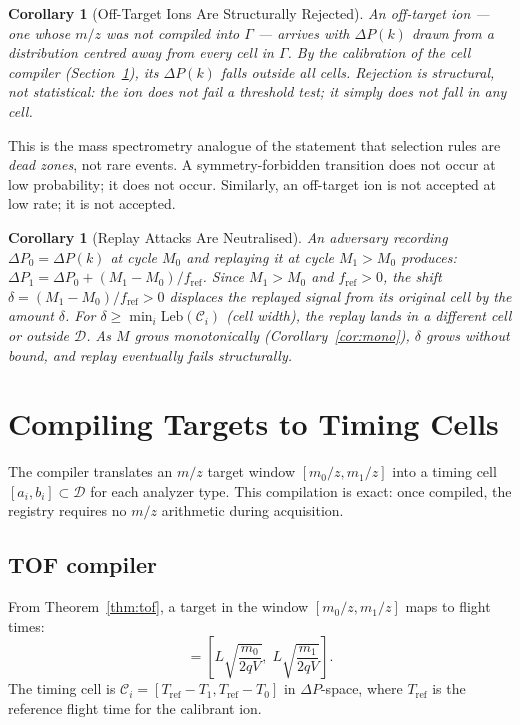\documentclass[twocolumn,10pt,a4paper]{article}
\theoremstyle{thmstyle}
\newtheorem{corollary}[theorem]{Corollary}
\theoremstyle{definition}
\theoremstyle{remark}
\newcommand{\DP}{\Delta P}
\newcommand{\fref}{f_{\mathrm{ref}}}
\newcommand{\calC}{\mathcal{C}}
\newcommand{\calD}{\mathcal{D}}
\newcommand{\Leb}{\mathrm{Leb}}
\begin{document}
\begin{corollary}[Off-Target Ions Are Structurally Rejected]
\label{cor:offtarget}
An off-target ion --- one whose $m/z$ was not compiled into $\Gamma$ ---
arrives with $\DP(k)$ drawn from a distribution centred away from every
cell in $\Gamma$. By the calibration of the cell compiler
(Section~\ref{sec:compiler}), its $\DP(k)$ falls outside all cells.
Rejection is structural, not statistical: the ion does not fail a
threshold test; it simply does not fall in any cell.
\end{corollary}

This is the mass spectrometry analogue of the statement that selection
rules are \emph{dead zones}, not rare events. A symmetry-forbidden
transition does not occur at low probability; it does not occur.
Similarly, an off-target ion is not accepted at low rate; it is not
accepted.

\begin{corollary}[Replay Attacks Are Neutralised]
\label{cor:replay}
An adversary recording $\DP_0 = \DP(k)$ at cycle $M_0$ and replaying
it at cycle $M_1 > M_0$ produces:
$\DP_1 = \DP_0 + (M_1 - M_0)/\fref$.
Since $M_1 > M_0$ and $\fref > 0$, the shift $\delta = (M_1-M_0)/\fref > 0$
displaces the replayed signal from its original cell by the amount
$\delta$. For $\delta \geq \min_i \Leb(\calC_i)$ (cell width), the
replay lands in a different cell or outside $\calD$. As $M$ grows
monotonically (Corollary~\ref{cor:mono}), $\delta$ grows without
bound, and replay eventually fails structurally.
\end{corollary}

\section{Compiling Targets to Timing Cells}
\label{sec:compiler}

The compiler translates an $m/z$ target window $[m_0/z, m_1/z]$ into
a timing cell $[a_i, b_i] \subset \calD$ for each analyzer type. This
compilation is exact: once compiled, the registry requires no $m/z$
arithmetic during acquisition.

\subsection{TOF compiler}

From Theorem~\ref{thm:tof}, a target in the window
$[m_0/z, m_1/z]$ maps to flight times:
\begin{equation}
[T_0, T_1] = \left[L\sqrt{\frac{m_0}{2qV}},\; L\sqrt{\frac{m_1}{2qV}}\right].
\label{eq:tof-cell}
\end{equation}
The timing cell is $\calC_i = [T_{\mathrm{ref}} - T_1, T_{\mathrm{ref}} - T_0]$
in $\DP$-space, where $T_{\mathrm{ref}}$ is the reference flight time
for the calibrant ion.
\end{document}
